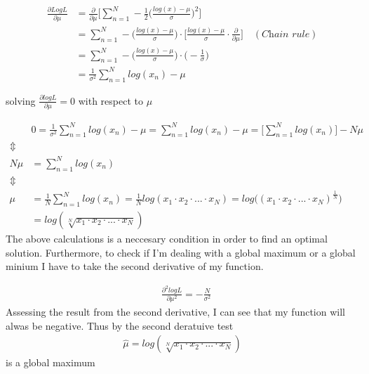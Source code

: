 \begin{align*}
    \frac{\partial Log L}{\partial \mu} & = \frac{\partial}{\partial \mu} \Bigg[ \sum_{n = 1}^{N} -\frac{1}{2} \Bigg( \frac{log(x) - \mu}{\sigma} \Bigg)^2 \Bigg] \\
                                        & = \sum_{n = 1}^{N} - \Bigg( \frac{log(x) - \mu}{\sigma} \Bigg) \cdot \Bigg[ \frac{log(x) - \mu}{\sigma} \cdot \frac{\partial}{\partial \mu} \Bigg] \quad (\textit{Chain rule}) \\
                                        & = \sum_{n = 1}^{N} - \Bigg( \frac{log(x) - \mu}{\sigma} \Bigg) \cdot \Bigg( - \frac{1}{\sigma}\Bigg) \\
                                        & = \frac{1}{\sigma^2} \sum_{n = 1}^{N} log(x_n) - \mu
\end{align*}

solving $ \frac{\partial logL}{\partial \mu} = 0 $ with respect to $\mu$

\begin{align*}
    & 0 = \frac{1}{\sigma^2} \sum_{n = 1}^{N} log(x_n) - \mu  = \sum_{n = 1}^{N} log(x_n) - \mu = \Bigg[ \sum_{n = 1}^{N} log(x_n)\Bigg] - N \mu\\
    \Updownarrow \\
    N \mu & = \sum_{n = 1}^{N} log(x_n) \\
    \Updownarrow \\
    \mu & = \frac{1}{N} \sum_{n = 1}^{N} log(x_n) = \frac{1}{N} log(x_1 \cdot x_2 \cdot ... \cdot x_N) = log \Bigg( (x_1 \cdot x_2 \cdot ... \cdot x_N)^{\frac{1}{N}}\Bigg) \\
    & = log(\sqrt[N]{x_1 \cdot x_2 \cdot ... \cdot x_N})
\end{align*}
The above calculations is a neccesary condition in order to find an optimal solution.
Furthermore, to check if I'm dealing with a global maximum or a global minium I have to take the second derivative of my function.

\begin{align*}
    & \frac{\partial^2 logL}{\partial \mu^2} =  - \frac{N}{\sigma^2}
\end{align*}
Assessing the result from the second derivative, I can see that my function will alwas be negative.
Thus by the second deratuive test
\begin{align*}
    \hat{\mu }= log(\sqrt[N]{x_1 \cdot x_2 \cdot ... \cdot x_N})
\end{align*}
is a global maximum



\newpage